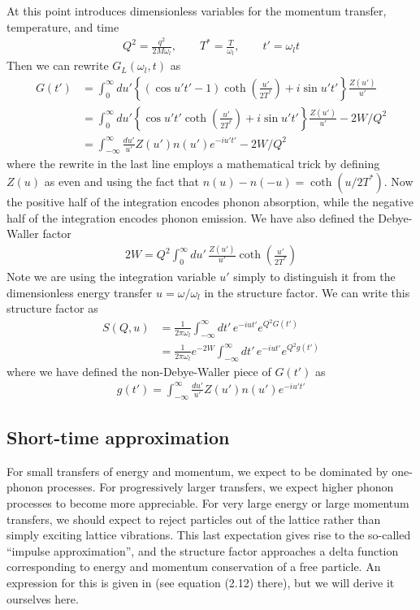 \documentclass{article}
\begin{document}
At this point \cite{impulse} introduces dimensionless variables for the momentum transfer, temperature, and time
\begin{align}
Q^2 = \frac{q^2}{2 M \omega_l}, \qquad T^* = \frac{T}{\omega_l}, \qquad t' = \omega_l t
\end{align}
Then we can rewrite $G_L(\omega_l, t)$ as
\begin{align}
G(t') &= \int_0^\infty du' \left\{ (\cos u't' - 1) \coth\left( \frac{u'}{2 T^*} \right) + i \sin u't' \right\} \frac{Z(u')}{u'} \nonumber\\
   &= \int_0^\infty du' \left\{ \cos u't' \coth\left( \frac{u'}{2 T^*} \right) + i \sin u't' \right\} \frac{Z(u')}{u'} - 2 W / Q^2 \nonumber\\
    &= \int_{-\infty}^\infty \frac{du'}{u'}Z(u')n(u')e^{-iu't'} - 2 W / Q^2
\end{align}
where the rewrite in the last line employs a mathematical trick by defining $Z(u)$ as even and using the fact that $n(u) - n(-u) = \coth(u/2 T^*)$. Now the positive half of the integration encodes phonon absorption, while the negative half of the integration encodes phonon emission. We have also defined the Debye-Waller factor
\begin{align}
2 W = Q^2 \int_0^\infty du'\, \frac{Z(u')}{u'} \coth\left( \frac{u'}{2 T^*} \right)
\end{align}
Note we are using the integration variable $u'$ simply to distinguish it from the dimensionless energy transfer $u = \omega / \omega_l$ in the structure factor. We can write this structure factor as
\begin{align}
S(Q, u) &= \frac{1}{2 \pi \omega_l} \int_{-\infty}^\infty dt'\, e^{-iut'} e^{Q^2 G(t')} \nonumber\\
   &= \frac{1}{2 \pi \omega_l} e^{-2 W} \int_{-\infty}^\infty dt'\, e^{-iut'} e^{Q^2 g(t')}
   \label{eq:DimensionlessStructureFactor}
\end{align}
where we have defined the non-Debye-Waller piece of $G(t')$ as
\begin{align}
g(t') = \int_{-\infty}^\infty \frac{du'}{u'}Z(u')n(u')e^{-iu't'}
\end{align}

\subsection{Short-time approximation}

For small transfers of energy and momentum, we expect to be dominated by one-phonon processes. For progressively larger transfers, we expect higher phonon processes to become more appreciable. For very large energy or large momentum transfers, we should expect to reject particles out of the lattice rather than simply exciting lattice vibrations. This last expectation gives rise to the so-called ``impulse approximation'', and the structure factor approaches a delta function corresponding to energy and momentum conservation of a free particle. An expression for this is given in \cite{impulse} (see equation (2.12) there), but we will derive it ourselves here.
\end{document}

